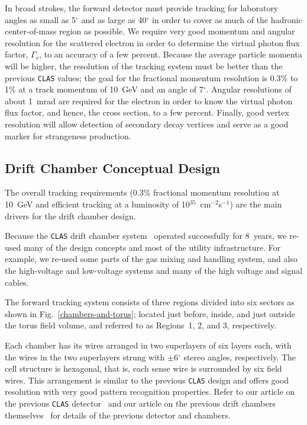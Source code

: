 In broad strokes, the forward detector must provide tracking for laboratory angles as 
small as 5$^\circ$ and as large as 40$^\circ$ in order to cover as much of 
the hadronic center-of-mass region as possible.  We require very good momentum 
and angular resolution for the scattered electron in order to determine the 
virtual photon flux factor, $\Gamma_v$, to an accuracy of a few percent.
Because the average particle momenta will be higher, the resolution of the 
tracking system must be better than the previous {\tt CLAS} values; the goal 
for the fractional momentum resolution is 0.3\% to  1\% at a track momentum 
of 10~GeV and an angle of 7$^\circ$.  Angular resolutions of about 1~mrad are required for the electron 
in order to know the virtual photon flux factor, and hence, the cross section, 
to a few percent. Finally, good vertex resolution will allow detection of 
secondary decay vertices and serve as a good marker for strangeness production.


\subsection{Drift Chamber Conceptual Design}

The overall tracking requirements (0.3\% fractional momentum resolution 
at 10~GeV and efficient tracking at a luminosity of 
10$^{35}$~cm$^{-2}$s$^{-1}$) are the main drivers for the drift chamber design.  

Because the {\tt CLAS} drift chamber system~\cite{dcnim} operated 
successfully for 8~years, we re-used many of the design concepts and 
most of the utility infrastructure.  For example, we re-used some
parts of the gas mixing and handling system, and also the high-voltage 
and low-voltage systems and many of the high voltage and signal cables. 

The forward tracking system consists of three regions divided into six
sectors as shown in Fig.~\ref{chambers-and-torus}; located just before, inside, 
and just outside the torus field volume, and referred to as Regions~1, 2, 
and 3, respectively.  

Each chamber has its wires arranged in two superlayers of
six layers each, with the wires in the two superlayers strung with 
$\pm$6$^\circ$ stereo angles, respectively.  The cell structure is 
hexagonal, that is, each sense wire is surrounded by six field wires.  This 
arrangement is similar to the previous {\tt CLAS} design and offers good 
resolution with very good pattern recognition properties.  Refer to our 
article on the previous {\tt CLAS} detector~\cite{clasnim} and our article 
on the previous drift chambers themselves~\cite{dcnim} for details of the 
previous detector and chambers.  

